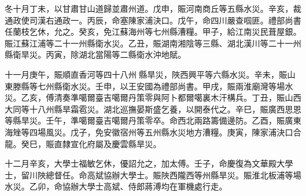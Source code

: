 \begin{pinyinscope}
冬十月丁未，以甘肅甘山道歸並肅州道。戊申，賑河南商丘等五縣水災。辛亥，裁通政使司漢右通政一。丙辰，命塞陳家浦決口。戊午，命四川嚴查啯匪。禮部尚書任蘭枝乞休，允之。癸亥，免江蘇海州等七州縣漕糧。甲子，給江南災民葺屋銀。賑江蘇江浦等二十一州縣衛水災。乙丑，賑湖南湘陰等三縣、湖北漢川等二十一州縣衛旱災。丙寅，除湖北當陽等二縣衛水沖地賦。

十一月庚午，賑順直香河等四十八州縣旱災，陜西興平等六縣水災。辛未，賑山東滕縣等七州縣衛水災。壬申，以王安國為禮部尚書。甲戌，賑兩淮廟灣等場水災。乙亥，傅清奏準噶爾臺吉噶爾丹策零與阿卜都爾噶裏木汗構兵。丁丑，賑山西大同等十八州縣旱霜雹災。湖北巡撫晏斯盛乞養，以開泰代之。辛巳，賑廣西思恩等縣旱災。壬午，準噶爾臺吉噶爾丹策零卒。命西北兩路籌備邊防。乙酉，賑廣東海矬等四場風災。戊子，免安徽宿州等五州縣水災地方漕糧。庚寅，陳家浦決口合龍。癸巳，賑直隸宣化府屬及慶雲縣旱災。

十二月辛亥，大學士福敏乞休，優詔允之，加太傅。壬子，命慶復為文華殿大學士，留川陜總督任。命高斌協辦大學士。賑陜西隴西等州縣旱災。賑淮北板浦等場水災。乙卯，命協辦大學士高斌、侍郎蔣溥均在軍機處行走。


\end{pinyinscope}